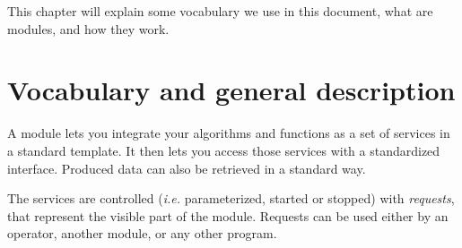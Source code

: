 %
%
%
%
%
%
%

This chapter will explain some vocabulary we use in this document, what
are modules, and how they work.


\section{Vocabulary and general description}
\label{sec|module|voc}

A module lets  you integrate your  algorithms and functions  as  a set of
services in a  standard template. It then lets  you access those services
with a standardized  interface. Produced data can  also be retrieved in a
standard way.

The services are controlled ({\em  i.e.} parameterized, started or stopped)
with  {\em   requests},  that  represent  the    visible  part   of   the
module. Requests  can be used either  by an  operator, another module, or
any other program.

